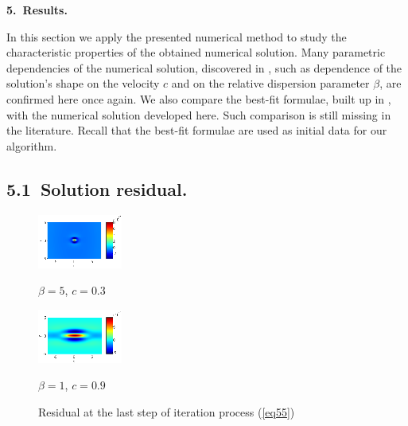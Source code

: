 \documentclass[leqno,11pt]{book}
\newcommand{\rf}[1]{(\ref{#1})}
\newcommand{\sect}[1]{\bigskip \par {\large\bf #1}}
\begin{document}
\bigskip

\sect{5.~Results.}\label{results}

In this section we apply the presented  numerical method  to study the characteristic properties of the obtained numerical solution.  Many parametric dependencies of the numerical solution,  discovered in \cite{Ch2011,Ch2012}, such as dependence of the solution's shape on the velocity $c$ and on the relative dispersion parameter $\beta$, are confirmed here once again.
 We   also compare  the best-fit  formulae,  built up in \cite{Ch2011}, with the numerical solution  developed here. Such comparison is still missing in the literature.
Recall that the best-fit formulae   are used as initial data for our algorithm. 

\subsection{5.1~Solution residual.}

\begin{figure}[htbp]
	\begin{minipage}[b]{0.5\linewidth}
		 \centering
		\includegraphics[width=\linewidth]{residual/residual_bt5c03.eps}
		\centerline{$\beta = 5$, $c = 0.3$}
	\end{minipage}	
	\begin{minipage}[b]{0.5\linewidth}
		\centering
		 \includegraphics[width=\linewidth]{residual/residual_bt1c09.eps}
	\centerline{$\beta = 1$, $c = 0.9$ }
	\end{minipage}
		\caption{Residual at the last step of iteration process \rf{eq55} }
		\label{resid}
\end{figure}
\end{document}
